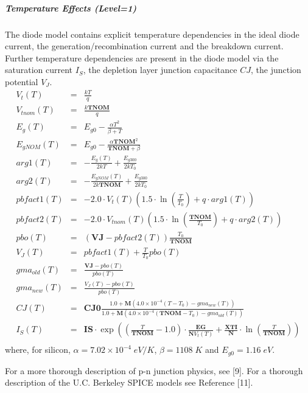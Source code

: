 \subparagraph{Temperature Effects (Level=1)}
The diode model contains explicit temperature dependencies in the ideal diode
current, the generation/recombination current and the breakdown current.
Further temperature dependencies are present in the diode model via the
saturation current $I_{S}$, the depletion layer junction capacitance $CJ$,
the junction potential $V_J$.
\begin{eqnarray*}
V_t(T) & = & \frac{kT}{q} \\
V_{tnom}(T) & = & \frac{k\mathbf{TNOM}}{q} \\
E_g(T) & = & E_{g0} - \frac{\alpha T^2}{\beta + T} \\
E_{gNOM}(T) & = & E_{g0} - \frac{\alpha\mathbf{TNOM}^2}{\mathbf{TNOM}+\beta} \\
arg1(T) & = & -\frac{E_g(T)}{2kT} + \frac{E_{g300}}{2kT_0} \\
arg2(T) & = & -\frac{E_{gNOM}(T)}{2k\mathbf{TNOM}} + \frac{E_{g300}}{2kT_0} \\
pbfact1(T) & = & -2.0\cdot V_t(T) \left(1.5\cdot\ln \left(\frac{T}{T_0}\right) + q\cdot arg1(T)\right) \\
pbfact2(T) & = & -2.0\cdot V_{tnom}(T) \left(1.5\cdot\ln \left(\frac{\mathbf{TNOM}}{T_0}\right) + q\cdot arg2(T)\right) \\
pbo(T) & = & \left(\mathbf{VJ}-pbfact2(T)\right)\frac{T_0}{\mathbf{TNOM}} \\
V_J(T) & = & pbfact1(T) + \frac{T}{T_0}pbo(T) \\
gma_{old}(T) & = & \frac{\mathbf{VJ}-pbo(T)}{pbo(T)} \\
gma_{new}(T) & = & \frac{V_J(T)-pbo(T)}{pbo(T)} \\
CJ(T) & = & \mathbf{CJ0}\frac{1.0+\mathbf{M}\left(4.0\times 10^{-4}\left(T-T_0\right)-gma_{new}(T)\right)}{1.0 + \mathbf{M}\left(4.0\times 10^{-4}\left(\mathbf{TNOM}-T_0\right)-gma_{old}(T)\right)} \\
I_S(T) & = & \mathbf{IS} \cdot\exp \left(\left(\frac{T}{\mathbf{TNOM}}-1.0\right) \cdot \frac{\mathbf{EG}}{\mathbf{N}V_t(T)} + \frac{\mathbf{XTI}}{\mathbf{N}} \cdot \ln \left(\frac{T}{\mathbf{TNOM}}\right)\right) \\
\end{eqnarray*}
where, for silicon, $\alpha = 7.02\times 10^{-4}\;eV/K$, $\beta =
1108\; K$ and $E_{g0} = 1.16\;eV$.

%
%
For a more thorough description of p-n junction physics, see [9].  For a
thorough description of the U.C. Berkeley SPICE models see Reference [11].
